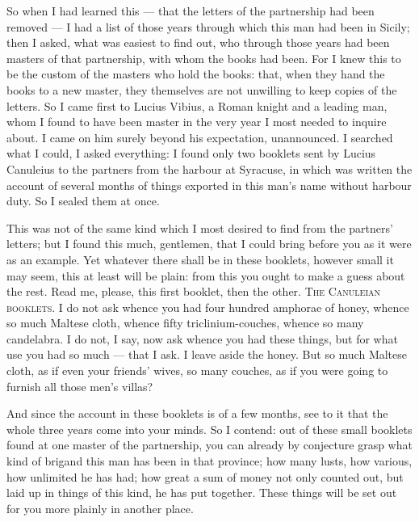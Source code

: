  So when I had learned this --- that the letters of the partnership had been removed --- I had a list of those years through which this man had been in Sicily; then I asked, what was easiest to find out, who through those years had been masters of that partnership, with whom the books had been. For I knew this to be the custom of the masters who hold the books: that, when they hand the books to a new master, they themselves are not unwilling to keep copies of the letters. So I came first to Lucius Vibius, a Roman knight and a leading man, whom I found to have been master in the very year I most needed to inquire about. I came on him surely beyond his expectation, unannounced. I searched what I could, I asked everything: I found only two booklets sent by Lucius Canuleius to the partners from the harbour at Syracuse, in which was written the account of several months of things exported in this man's name without harbour duty. So I sealed them at once.

 This was not of the same kind which I most desired to find from the partners' letters; but I found this much, gentlemen, that I could bring before you as it were as an example. Yet whatever there shall be in these booklets, however small it may seem, this at least will be plain: from this you ought to make a guess about the rest. Read me, please, this first booklet, then the other. \textsc{The Canuleian booklets}. I do not ask whence you had four hundred amphorae of honey, whence so much Maltese cloth, whence fifty triclinium-couches, whence so many candelabra. I do not, I say, now ask whence you had these things, but for what use you had so much --- that I ask. I leave aside the honey. But so much Maltese cloth, as if even your friends' wives, so many couches, as if you were going to furnish all those men's villas?

 And since the account in these booklets is of a few months, see to it that the whole three years come into your minds. So I contend: out of these small booklets found at one master of the partnership, you can already by conjecture grasp what kind of brigand this man has been in that province; how many lusts, how various, how unlimited he has had; how great a sum of money not only counted out, but laid up in things of this kind, he has put together. These things will be set out for you more plainly in another place.

